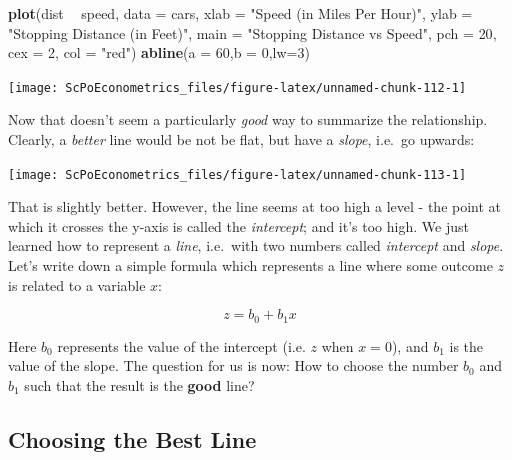 \documentclass[]{book}
\newenvironment{Shaded}{\begin{snugshade}}{\end{snugshade}}
\newcommand{\KeywordTok}[1]{\textcolor[rgb]{0.13,0.29,0.53}{\textbf{#1}}}
\newcommand{\DataTypeTok}[1]{\textcolor[rgb]{0.13,0.29,0.53}{#1}}
\newcommand{\DecValTok}[1]{\textcolor[rgb]{0.00,0.00,0.81}{#1}}
\newcommand{\StringTok}[1]{\textcolor[rgb]{0.31,0.60,0.02}{#1}}
\newcommand{\OperatorTok}[1]{\textcolor[rgb]{0.81,0.36,0.00}{\textbf{#1}}}
\newcommand{\NormalTok}[1]{#1}
\begin{document}
\begin{Shaded}
\begin{Highlighting}[]
\KeywordTok{plot}\NormalTok{(dist }\OperatorTok{~}\StringTok{ }\NormalTok{speed, }\DataTypeTok{data =}\NormalTok{ cars,}
     \DataTypeTok{xlab =} \StringTok{"Speed (in Miles Per Hour)"}\NormalTok{,}
     \DataTypeTok{ylab =} \StringTok{"Stopping Distance (in Feet)"}\NormalTok{,}
     \DataTypeTok{main =} \StringTok{"Stopping Distance vs Speed"}\NormalTok{,}
     \DataTypeTok{pch  =} \DecValTok{20}\NormalTok{,}
     \DataTypeTok{cex  =} \DecValTok{2}\NormalTok{,}
     \DataTypeTok{col  =} \StringTok{"red"}\NormalTok{)}
\KeywordTok{abline}\NormalTok{(}\DataTypeTok{a =} \DecValTok{60}\NormalTok{,}\DataTypeTok{b =} \DecValTok{0}\NormalTok{,}\DataTypeTok{lw=}\DecValTok{3}\NormalTok{)}
\end{Highlighting}
\end{Shaded}

\begin{center}\texttt{[image: ScPoEconometrics\_files/figure-latex/unnamed-chunk-112-1]} \end{center}

Now that doesn't seem a particularly \emph{good} way to summarize the
relationship. Clearly, a \emph{better} line would be not be flat, but
have a \emph{slope}, i.e.~go upwards:

\begin{center}\texttt{[image: ScPoEconometrics\_files/figure-latex/unnamed-chunk-113-1]} \end{center}

That is slightly better. However, the line seems at too high a level -
the point at which it crosses the y-axis is called the \emph{intercept};
and it's too high. We just learned how to represent a \emph{line},
i.e.~with two numbers called \emph{intercept} and \emph{slope}. Let's
write down a simple formula which represents a line where some outcome
\(z\) is related to a variable \(x\):

\begin{equation}
z = b_0 + b_1 x \label{eq:bline}
\end{equation}

Here \(b_0\) represents the value of the intercept (i.e. \(z\) when
\(x=0\)), and \(b_1\) is the value of the slope. The question for us is
now: How to choose the number \(b_0\) and \(b_1\) such that the result
is the \textbf{good} line?

\subsection{Choosing the Best Line}\label{choosing-the-best-line}
\end{document}
